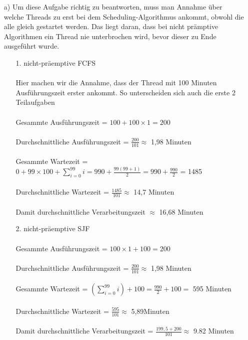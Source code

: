 \begin{enumerate}
    
\item[a)]
Um diese Aufgabe richtig zu beantworten, muss man Annahme über welche Threads zu erst bei dem Scheduling-Algorithmus ankommt, obwohl die alle gleich gestartet werden. Das liegt daran, dass bei nicht prämptive Algorithmen ein Thread nie unterbrochen wird, bevor dieser zu Ende ausgeführt wurde.

\begin{enumerate}

\item[1. ] nicht-präemptive FCFS \\ \\
Hier machen wir die Annahme, dass der Thread mit 100 Minuten Ausführungszeit erster ankommt. So unterscheiden sich auch die erste 2 Teilaufgaben \\ \\
Gesammte Ausführungszeit = $100 + 100 \times 1 = 200$ \\ \\
Durchschnittliche Ausführungszeit = $ \frac{200}{101} \approx $ 1,98 Minuten \\ \\
Gesammte Wartezeit = $0 + 99 \times 100 + \sum_{i=0}^{99} i = 990 + \frac{99(99+1)}{2} = 990 + \frac{990}{2}$ = 1485\\ \\
Durchschnittliche Wartezeit = $\frac{1485}{101} \approx $ 14,7 Minuten \\ \\
Damit durchschnittliche Verarbeitungszeit $\approx $ 16,68 Minuten \\

\item[2. ] nicht-präemptive SJF \\ \\
Gesammte Ausführungszeit = $100 \times 1 + 100 = 200$ \\ \\
Durchschnittliche Ausführungszeit = $ \frac{200}{101} \approx $ 1,98 Minuten \\ \\
Gesammte Wartezeit = $(\sum_{i=0}^{99} i) + 100 = \frac{990}{2} + 100 =  $ 595 Minuten \\ \\
Durchschnittliche Wartezeit = $\frac{595}{101} \approx $ 5,89Minuten \\ \\
Damit durchschnittliche Verarbeitungszeit = $\frac{199,5 + 200}{101} \approx $ 9.82 Minuten \\


\end{enumerate}
\end{enumerate}
